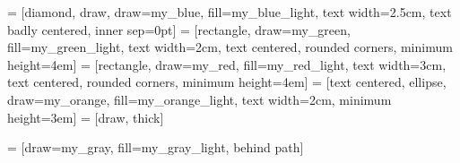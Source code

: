 

 = [diamond, draw, draw=my_blue, fill=my_blue_light, text width=2.5cm, text badly centered, inner sep=0pt]
 = [rectangle, draw=my_green, fill=my_green_light, text width=2cm, text centered, rounded corners, minimum height=4em]
 = [rectangle, draw=my_red, fill=my_red_light, text width=3cm, text centered, rounded corners, minimum height=4em]
 = [text centered, ellipse, draw=my_orange, fill=my_orange_light, text width=2cm, minimum height=3em]
 = [draw, thick]

 = [draw=my_gray, fill=my_gray_light, behind path]